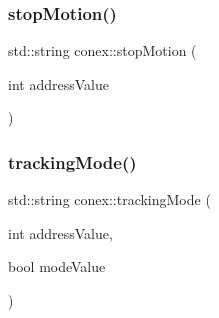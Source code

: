 \mbox{\label{namespaceconex_aa908bd9ff7a78d0b2bd7bcbe2ef7080c}} 
\subsubsection{\texorpdfstring{stop\+Motion()}{stopMotion()}}
{\footnotesize\ttfamily std\+::string conex\+::stop\+Motion (\begin{DoxyParamCaption}\item[{int}]{address\+Value }\end{DoxyParamCaption})}

\mbox{\label{namespaceconex_a231ad931cd8782bcfd30f4b60ef2e3d8}} 
\subsubsection{\texorpdfstring{tracking\+Mode()}{trackingMode()}}
{\footnotesize\ttfamily std\+::string conex\+::tracking\+Mode (\begin{DoxyParamCaption}\item[{int}]{address\+Value,  }\item[{bool}]{mode\+Value }\end{DoxyParamCaption})}


